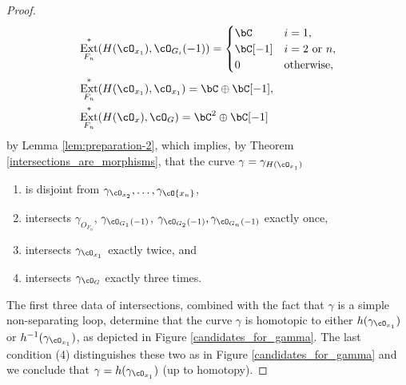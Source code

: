 \documentclass[12pt]{amsart}
\numberwithin{equation}{section}
\theoremstyle{plain}
\theoremstyle{definition}
\DeclareMathOperator{\Ext}{\mathrm{Ext}}
\begin{document}
\begin{proof}
\begin{align}
         & \Ext^*_{F_n}(H(\cO_{x_1}), \cO_{G_i}(-1)) = \begin{cases}
                                                           \bC     & i = 1,               \\
                                                           \bC[-1] & i = 2 \text{ or } n, \\
                                                           0       & \text{otherwise},
                                                       \end{cases} \\
         & \Ext^*_{F_n}(H(\cO_{x_1}), \cO_{x_1}) = \bC \oplus \bC[-1],                \\
         & \Ext^*_{F_n}(H(\cO_{x}), \cO_{G}) = \bC^2 \oplus \bC[-1]
    \end{align}
    by Lemma \ref{lem:preparation-2}, which implies, by Theorem \ref{intersections_are_morphisms},
    that the curve $\gamma = \gamma_{H(\cO_{x_1})}$
    \begin{enumerate}
        \item is disjoint from $\gamma_{\cO_{x_2}}, \dots, \gamma_{\cO{x_n}}$,
        \item intersects
              $\gamma_{O_{F_n}}$, $\gamma_{\cO_{G_1}(-1)}$,
              $\gamma_{\cO_{G_2}(-1)}, \gamma_{\cO_{G_n}(-1)}$ exactly once,
        \item intersects $\gamma_{\cO_{x_1}}$ exactly twice, and
        \item intersects $\gamma_{\cO_{G}}$ exactly three times.
    \end{enumerate}
    The first three data of intersections, combined with the fact that $\gamma$ is a simple non-separating loop, determine that the curve $\gamma$ is homotopic to either $h(\gamma_{\cO_{x_1}})$ or $h^{-1}(\gamma_{\cO_{x_1}})$, as depicted in Figure \ref{candidates_for_gamma}.
    The last condition (4) distinguishes these two as in Figure \ref{candidates_for_gamma} and we conclude that $\gamma = h(\gamma_{\cO_{x_1}})$ (up to homotopy).


\end{proof}
\end{document}
